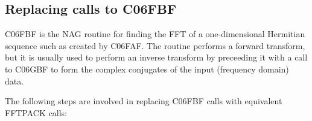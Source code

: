 \documentclass[11pt,twoside,nolof]{starlink}
\begin{document}

\subsection{Replacing calls to C06FBF}

   C06FBF is the NAG routine for finding the FFT of a one-dimensional
   Hermitian sequence such as created by C06FAF. The routine performs a
   forward transform, but it is usually used to perform an inverse
   transform by preceeding it with a call to C06GBF to form the complex
   conjugates of the input (frequency domain) data.

   The following steps are involved in replacing C06FBF calls with
   equivalent FFTPACK calls:
\end{document}
